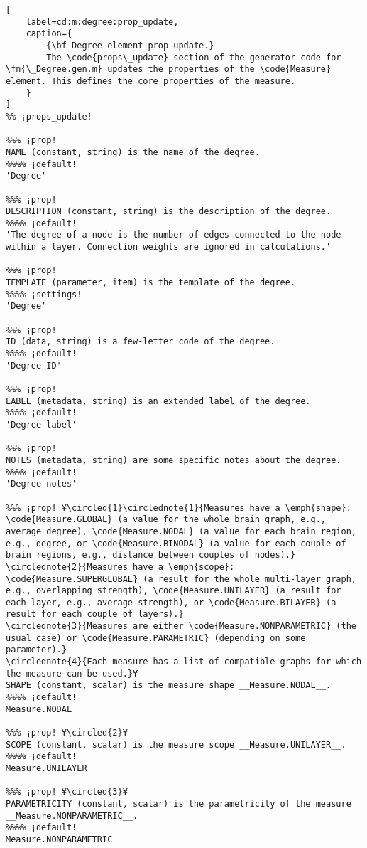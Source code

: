 \documentclass{tufte-handout}
\begin{document}
\begin{lstlisting}[
	label=cd:m:degree:prop_update,
	caption={
		{\bf Degree element prop update.}
		The \code{props\_update} section of the generator code for \fn{\_Degree.gen.m} updates the properties of the \code{Measure} element. This defines the core properties of the measure.
	}
]
%% ¡props_update!

%%% ¡prop!
NAME (constant, string) is the name of the degree.
%%%% ¡default!
'Degree'

%%% ¡prop!
DESCRIPTION (constant, string) is the description of the degree.
%%%% ¡default!
'The degree of a node is the number of edges connected to the node within a layer. Connection weights are ignored in calculations.'

%%% ¡prop!
TEMPLATE (parameter, item) is the template of the degree.
%%%% ¡settings!
'Degree'

%%% ¡prop!
ID (data, string) is a few-letter code of the degree.
%%%% ¡default!
'Degree ID'

%%% ¡prop!
LABEL (metadata, string) is an extended label of the degree.
%%%% ¡default!
'Degree label'

%%% ¡prop!
NOTES (metadata, string) are some specific notes about the degree.
%%%% ¡default!
'Degree notes'

%%% ¡prop! ¥\circled{1}\circlednote{1}{Measures have a \emph{shape}: \code{Measure.GLOBAL} (a value for the whole brain graph, e.g., average degree), \code{Measure.NODAL} (a value for each brain region, e.g., degree, or \code{Measure.BINODAL} (a value for each couple of brain regions, e.g., distance between couples of nodes).}
\circlednote{2}{Measures have a \emph{scope}: \code{Measure.SUPERGLOBAL} (a result for the whole multi-layer graph, e.g., overlapping strength), \code{Measure.UNILAYER} (a result for each layer, e.g., average strength), or \code{Measure.BILAYER} (a result for each couple of layers).}
\circlednote{3}{Measures are either \code{Measure.NONPARAMETRIC} (the usual case) or \code{Measure.PARAMETRIC} (depending on some parameter).}
\circlednote{4}{Each measure has a list of compatible graphs for which the measure can be used.}¥
SHAPE (constant, scalar) is the measure shape __Measure.NODAL__.
%%%% ¡default!
Measure.NODAL

%%% ¡prop! ¥\circled{2}¥
SCOPE (constant, scalar) is the measure scope __Measure.UNILAYER__.
%%%% ¡default!
Measure.UNILAYER

%%% ¡prop! ¥\circled{3}¥
PARAMETRICITY (constant, scalar) is the parametricity of the measure __Measure.NONPARAMETRIC__.
%%%% ¡default!
Measure.NONPARAMETRIC


\end{lstlisting}
\end{document}
